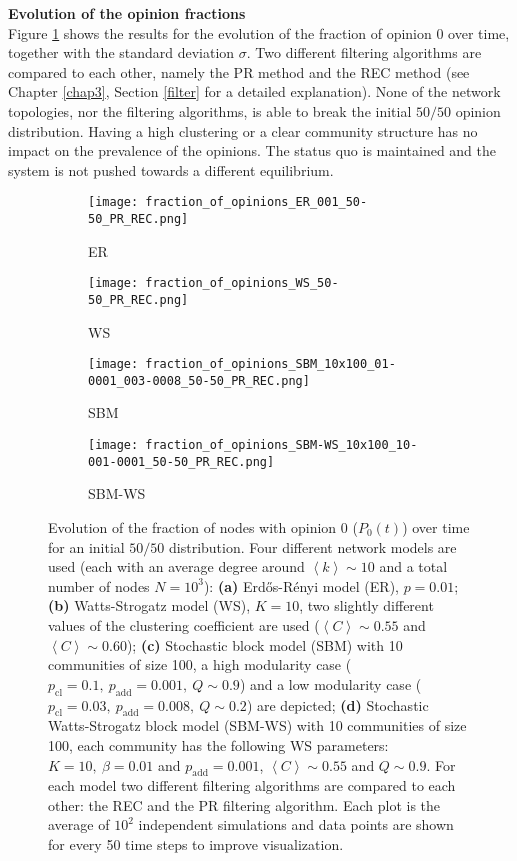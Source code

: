 \documentclass[11 pt , letterpaper , twoside , openright]{book}
\begin{document}
\textbf{Evolution of the opinion fractions}\\
\newline
Figure \ref{ev_op_50_50} shows the results for the evolution of the fraction of opinion 0 over time, together with the standard deviation $\sigma$. Two different filtering algorithms are compared to each other, namely the PR method and the REC method (see Chapter \ref{chap3}, Section \ref{filter} for a detailed explanation). None of the network topologies, nor the filtering algorithms, is able to break the initial $50/50$ opinion distribution. Having a high clustering or a clear community structure has no impact on the prevalence of the opinions. The status quo is maintained and the system is not pushed towards a different equilibrium.
\newpage
\begin{figure}[H]
  \begin{subfigure}[b]{0.49\textwidth}
  	\texttt{[image: fraction\_of\_opinions\_ER\_001\_50-50\_PR\_REC.png]}
    \caption{ER}
  \end{subfigure}
  \begin{subfigure}[b]{0.49\textwidth}
  	\texttt{[image: fraction\_of\_opinions\_WS\_50-50\_PR\_REC.png]}
    \caption{WS}
  \end{subfigure}
  \begin{subfigure}[b]{0.49\textwidth}
    \texttt{[image: fraction\_of\_opinions\_SBM\_10x100\_01-0001\_003-0008\_50-50\_PR\_REC.png]}
    \caption{SBM}
  \end{subfigure}
  \begin{subfigure}[b]{0.49\textwidth}
    \texttt{[image: fraction\_of\_opinions\_SBM-WS\_10x100\_10-001-0001\_50-50\_PR\_REC.png]}
    \caption{SBM-WS}
  \end{subfigure}
  \captionsetup{format=plain}
  \caption[Evolution of the fraction of nodes with opinion 0 ($P_0(t)$) over time for an initial $50/50$ opinion distribution]{Evolution of the fraction of nodes with opinion 0 ($P_0(t)$) over time for an initial $50/50$ distribution. Four different network models are used (each with an average degree around $\left<k\right> \sim 10$ and a total number of nodes $N = 10^3$): \textbf{(a)} Erd\H{o}s-R\'{e}nyi model (ER), $p=0.01$; \textbf{(b)} Watts-Strogatz model (WS), $K = 10$, two slightly different values of the clustering coefficient are used ($\left<C\right> \sim 0.55$ and $\left<C\right> \sim 0.60$); \textbf{(c)} Stochastic block model (SBM) with 10 communities of size 100, a high modularity case ($p_{\text{cl}} = 0.1,\ p_{\text{add}} = 0.001,\ Q \sim 0.9$) and a low modularity case ($p_{\text{cl}} = 0.03,\ p_{\text{add}} = 0.008,\ Q \sim 0.2$) are depicted; \textbf{(d)} Stochastic Watts-Strogatz block model (SBM-WS) with 10 communities of size 100, each community has the following WS parameters: $K = 10,\ \beta = 0.01$ and $p_{\text{add}} = 0.001$, $\left<C\right> \sim 0.55$ and $Q \sim 0.9$. For each model two different filtering algorithms are compared to each other: the REC and the PR filtering algorithm. Each plot is the average of $10^2$ independent simulations and data points are shown for every 50 time steps to improve visualization.}%
\label{ev_op_50_50}
\end{figure}
\end{document}
